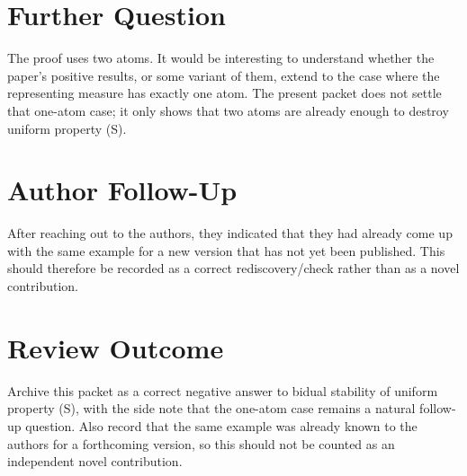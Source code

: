 \documentclass[11pt]{article}
\begin{document}
\section*{Further Question}

The proof uses two atoms. It would be interesting to understand whether the
paper's positive results, or some variant of them, extend to the case where
the representing measure has exactly one atom. The present packet does not
settle that one-atom case; it only shows that two atoms are already enough to
destroy uniform property (S).

\section*{Author Follow-Up}

After reaching out to the authors, they indicated that they had already come
up with the same example for a new version that has not yet been published.
This should therefore be recorded as a correct rediscovery/check rather than
as a novel contribution.

\section*{Review Outcome}

Archive this packet as a correct negative answer to bidual stability of
uniform property (S), with the side note that the one-atom case remains a
natural follow-up question. Also record that the same example was already
known to the authors for a forthcoming version, so this should not be counted
as an independent novel contribution.
\end{document}
